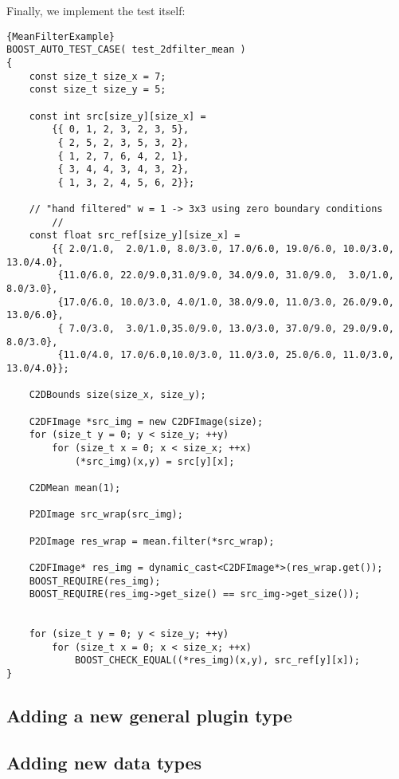 \documentclass[english, 10pt, a4paper,headsepline,openany]{scrbook}
\begin{document}
Finally, we implement the test itself: 
\begin{lstlisting}{MeanFilterExample}
BOOST_AUTO_TEST_CASE( test_2dfilter_mean )
{
	const size_t size_x = 7;
	const size_t size_y = 5;

	const int src[size_y][size_x] =
		{{ 0, 1, 2, 3, 2, 3, 5},
		 { 2, 5, 2, 3, 5, 3, 2},
		 { 1, 2, 7, 6, 4, 2, 1},
		 { 3, 4, 4, 3, 4, 3, 2},
		 { 1, 3, 2, 4, 5, 6, 2}};

	// "hand filtered" w = 1 -> 3x3 using zero boundary conditions 
        //
	const float src_ref[size_y][size_x] =
        {{ 2.0/1.0,  2.0/1.0, 8.0/3.0, 17.0/6.0, 19.0/6.0, 10.0/3.0, 13.0/4.0},
         {11.0/6.0, 22.0/9.0,31.0/9.0, 34.0/9.0, 31.0/9.0,  3.0/1.0,  8.0/3.0},
         {17.0/6.0, 10.0/3.0, 4.0/1.0, 38.0/9.0, 11.0/3.0, 26.0/9.0, 13.0/6.0},
         { 7.0/3.0,  3.0/1.0,35.0/9.0, 13.0/3.0, 37.0/9.0, 29.0/9.0,  8.0/3.0},
         {11.0/4.0, 17.0/6.0,10.0/3.0, 11.0/3.0, 25.0/6.0, 11.0/3.0, 13.0/4.0}}; 

	C2DBounds size(size_x, size_y);

	C2DFImage *src_img = new C2DFImage(size);
	for (size_t y = 0; y < size_y; ++y)
		for (size_t x = 0; x < size_x; ++x)
			(*src_img)(x,y) = src[y][x];

	C2DMean mean(1);

	P2DImage src_wrap(src_img);

	P2DImage res_wrap = mean.filter(*src_wrap);

	C2DFImage* res_img = dynamic_cast<C2DFImage*>(res_wrap.get());
	BOOST_REQUIRE(res_img);
	BOOST_REQUIRE(res_img->get_size() == src_img->get_size());


	for (size_t y = 0; y < size_y; ++y)
		for (size_t x = 0; x < size_x; ++x)
			BOOST_CHECK_EQUAL((*res_img)(x,y), src_ref[y][x]);
}
\end{lstlisting}







\subsection{Adding a new general plugin type}
\label{ch:addpluginstype}

\subsection{Adding new data types}
\label{sec:adddatatypeio}



\cleardoublepage{}

\end{document}
